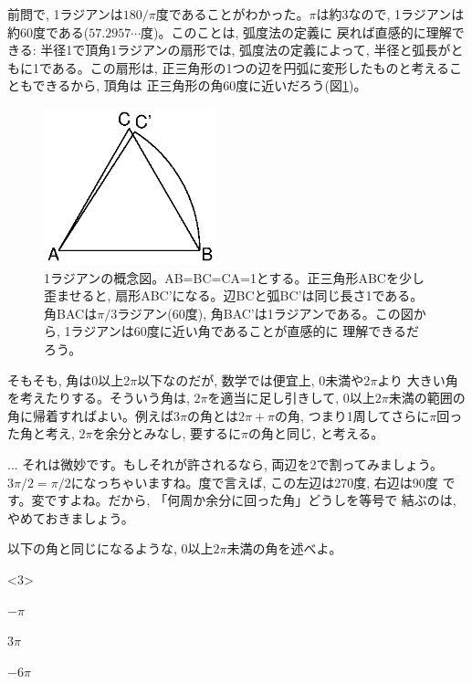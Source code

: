 前問で, 1ラジアンは$180/\pi$度であることがわかった。$\pi$は約3なので, 
1ラジアンは約60度である($57.2957\cdots$度)。このことは, 弧度法の定義に
戻れば直感的に理解できる: 半径1で頂角1ラジアンの扇形では, 弧度法の定義によって, 
半径と弧長がともに1である。この扇形は, 
正三角形の1つの辺を円弧に変形したものと考えることもできるから, 頂角は
正三角形の角60度に近いだろう(図\ref{fig:1rad})。

\begin{figure}[h]
    \centering
    \includegraphics[width=5cm]{1rad.eps}
    \caption{1ラジアンの概念図。AB=BC=CA=1とする。正三角形ABCを少し歪ませると, 
扇形ABC'になる。辺BCと弧BC'は同じ長さ1である。角BACは$\pi/3$ラジアン(60度), 
角BAC'は1ラジアンである。この図から, 1ラジアンは60度に近い角であることが直感的に
理解できるだろう。}\label{fig:1rad}
\end{figure}
\mv

そもそも, 角は0以上2$\pi$以下なのだが, 数学では便宜上, 0未満や2$\pi$より
大きい角を考えたりする。そういう角は, $2\pi$を適当に足し引きして, 
0以上$2\pi$未満の範囲の角に帰着すればよい。例えば$3\pi$の角とは$2\pi+\pi$の角, 
つまり1周してさらに$\pi$回った角と考え, $2\pi$を余分とみなし, 
要するに$\pi$の角と同じ, と考える。

\begin{faq}{\small{}
... それは微妙です。もしそれが許されるなら, 両辺を2で割ってみましょう。
$3\pi/2=\pi/2$になっちゃいますね。度で言えば, この左辺は270度, 右辺は90度
です。変ですよね。だから, 「何周か余分に回った角」どうしを等号で
結ぶのは, やめておきましょう。}\end{faq}

\begin{q}\label{q:trig_rad2rad} 以下の角と同じになるような, 
0以上$2\pi$未満の角を述べよ。
\begin{edaenumerate}<3>
\item $-\pi$
\item $3\pi$
\item $-6\pi$
\end{edaenumerate}\end{q}
\mv

